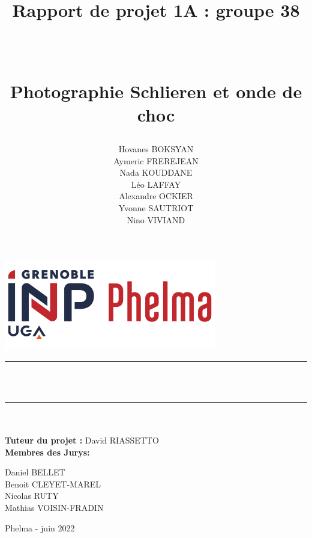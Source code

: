 \documentclass[12 pt, a4paper]{report}
\title{\begin{large} Rapport de projet 1A : groupe 38 \end{large}\\ [3ex]
\begin{Large}
	\textbf{Photographie Schlieren et onde de choc}
\end{Large}}
\author{Hovanes BOKSYAN \\
		Aymeric FREREJEAN \\
		Nada KOUDDANE \\
		Léo LAFFAY \\
		Alexandre OCKIER \\
		Yvonne SAUTRIOT \\
		Nino VIVIAND}
\newcommand{\tutor}{\textbf{Tuteur du projet :} David RIASSETTO}
\newcommand{\HRule}{\rule{\linewidth}{0.2mm}}
\begin{document}
	\begin{spacing}{1.15}
		\makeatletter
			\begin{titlepage}
				\includegraphics[scale = 0.5]{logo.jpeg}
				\vspace{1.5cm}
				\vfill
				\begin{center}
					\HRule \\ [2ex]
					{\@title }\\
					\HRule \\ [3ex]
					{\@author}\\ [5ex]
					{\tutor}\\[7ex]
					\textbf{Membres des Jurys:}\\
					\begin{multicols}{2}
						Daniel BELLET\\
						Benoit CLEYET-MAREL\\
						\columnbreak
						Nicolas RUTY\\
						Mathias VOISIN-FRADIN
					\end{multicols}
				\vfill
				\end{center}
			\raggedleft\vfill{Phelma - juin 2022}
			\end{titlepage}
		\makeatother
	\newpage
	\thispagestyle{empty}
	\addtocounter{page}{1}
	\tableofcontents
	\newpage
	\listoffigures
	\begingroup
	\let\clearpage\relax
	\listoftables
	\endgroup
	\newpage
	\fancyhf{}
	\renewcommand{\footrulewidth}{0.4pt}
	\rfoot{\thepage}
	
	\newpage
	
	\newpage
	
	\newpage
	\newpage
	
	\newpage
	
	\newpage
	
	
	\end{spacing}
\end{document}
